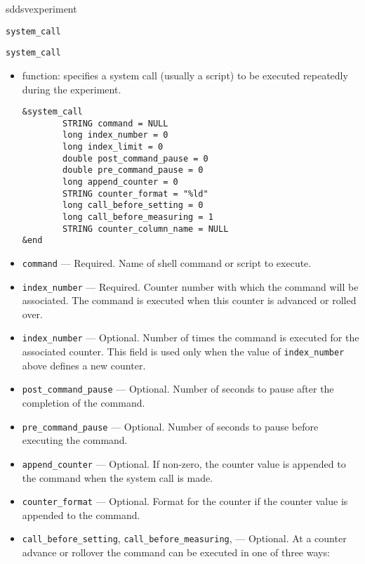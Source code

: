 \begin{sddsprog}{sddsvexperiment}
\begin{itemize}
\begin{latexonly}
\newpage\begin{center}{\Large \verb+system_call+}\end{center}
\end{latexonly}
\begin{htmlonly}
  \item {\Large \verb+system_call+}
\end{htmlonly}
  \begin{itemize}
    \item function: specifies a system call (usually a script) to be executed repeatedly during the experiment.
\begin{verbatim}
&system_call
        STRING command = NULL
        long index_number = 0
        long index_limit = 0
        double post_command_pause = 0
        double pre_command_pause = 0
        long append_counter = 0
        STRING counter_format = "%ld"
        long call_before_setting = 0
        long call_before_measuring = 1
        STRING counter_column_name = NULL
&end
\end{verbatim}
    \item {\verb+command+} --- Required. Name of shell command or script to execute.
    \item {\verb+index_number+} --- Required. Counter number with which the command will be associated. The command is executed
                when this counter is advanced or rolled over.
    \item {\verb+index_number+} --- Optional. Number of times the command is executed for
                the associated counter. This field is used only when the value of {\verb+index_number+} above defines a new counter.
    \item {\verb+post_command_pause+} --- Optional. Number of seconds to pause after the completion of the command.
    \item {\verb+pre_command_pause+} --- Optional. Number of seconds to pause before executing the command.
    \item {\verb+append_counter+} --- Optional. If non-zero, the counter value is appended to the command when the
                system call is made.
    \item {\verb+counter_format+} --- Optional. Format for the counter if the counter value is appended to the command.
    \item {\verb+call_before_setting+}, {\verb+call_before_measuring+}, --- Optional.
                At a counter advance or rollover
                the command can be executed in one of three ways:

\end{itemize}
\end{itemize}
\end{sddsprog}
